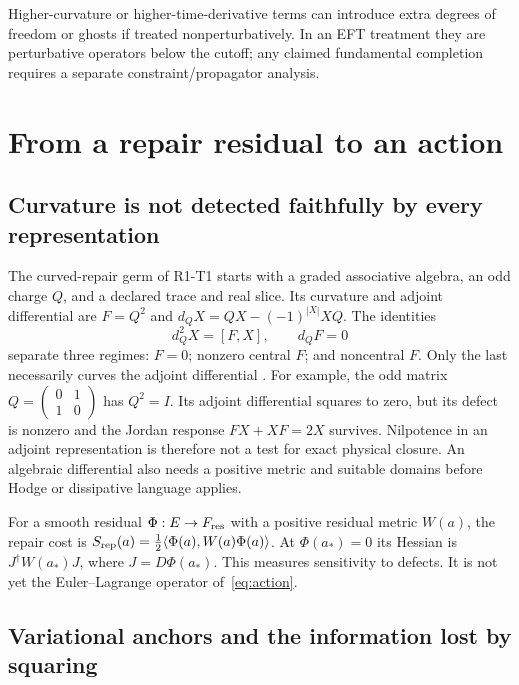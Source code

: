 \documentclass[11pt]{article}
\begin{document}
Higher-curvature or higher-time-derivative terms can introduce extra degrees
of freedom or ghosts if treated nonperturbatively.  In an EFT treatment they
are perturbative operators below the cutoff; any claimed fundamental
completion requires a separate constraint/propagator analysis.

\section{From a repair residual to an action}
\label{sec:repair-action}

\subsection{Curvature is not detected faithfully by every representation}

The curved-repair germ of R1-T1 starts with a graded associative algebra,
an odd charge $Q$, and a declared trace and real slice. Its curvature and
adjoint differential are $F=Q^2$ and
$d_Q X=QX-(-1)^{|X|}XQ$. The identities
\[
 d_Q^2X=[F,X],\qquad d_QF=0
\]
separate three regimes: $F=0$; nonzero central $F$; and noncentral $F$.
Only the last necessarily curves the adjoint differential
\cite{FrozenGerm}. For example, the odd matrix
$Q=\left(\begin{smallmatrix}0&1\\1&0\end{smallmatrix}\right)$
has $Q^2=I$. Its adjoint differential squares to zero, but its defect is
nonzero and the Jordan response $FX+XF=2X$ survives. Nilpotence in an
adjoint representation is therefore not a test for exact physical closure.
An algebraic differential also needs a positive metric and suitable domains
before Hodge or dissipative language applies.

For a smooth residual $\Phi:E\to F_{\rm res}$ with a positive residual
metric $W(a)$, the repair cost is
$S_{\rm rep}(a)=\frac12\langle\Phi(a),W(a)\Phi(a)\rangle$.
At $\Phi(a_*)=0$ its Hessian is $J^\dagger W(a_*)J$, where
$J=D\Phi(a_*)$. This measures sensitivity to defects. It is not yet the
Euler--Lagrange operator of~\eqref{eq:action}.

\subsection{Variational anchors and the information lost by squaring}
\label{sec:anchor}
\end{document}
